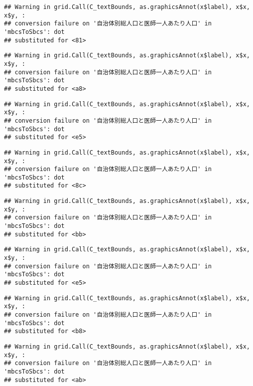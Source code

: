 \documentclass[
]{article}
\begin{document}
\begin{verbatim}
## Warning in grid.Call(C_textBounds, as.graphicsAnnot(x$label), x$x, x$y, :
## conversion failure on '自治体別総人口と医師一人あたり人口' in 'mbcsToSbcs': dot
## substituted for <81>
\end{verbatim}

\begin{verbatim}
## Warning in grid.Call(C_textBounds, as.graphicsAnnot(x$label), x$x, x$y, :
## conversion failure on '自治体別総人口と医師一人あたり人口' in 'mbcsToSbcs': dot
## substituted for <a8>
\end{verbatim}

\begin{verbatim}
## Warning in grid.Call(C_textBounds, as.graphicsAnnot(x$label), x$x, x$y, :
## conversion failure on '自治体別総人口と医師一人あたり人口' in 'mbcsToSbcs': dot
## substituted for <e5>
\end{verbatim}

\begin{verbatim}
## Warning in grid.Call(C_textBounds, as.graphicsAnnot(x$label), x$x, x$y, :
## conversion failure on '自治体別総人口と医師一人あたり人口' in 'mbcsToSbcs': dot
## substituted for <8c>
\end{verbatim}

\begin{verbatim}
## Warning in grid.Call(C_textBounds, as.graphicsAnnot(x$label), x$x, x$y, :
## conversion failure on '自治体別総人口と医師一人あたり人口' in 'mbcsToSbcs': dot
## substituted for <bb>
\end{verbatim}

\begin{verbatim}
## Warning in grid.Call(C_textBounds, as.graphicsAnnot(x$label), x$x, x$y, :
## conversion failure on '自治体別総人口と医師一人あたり人口' in 'mbcsToSbcs': dot
## substituted for <e5>
\end{verbatim}

\begin{verbatim}
## Warning in grid.Call(C_textBounds, as.graphicsAnnot(x$label), x$x, x$y, :
## conversion failure on '自治体別総人口と医師一人あたり人口' in 'mbcsToSbcs': dot
## substituted for <b8>
\end{verbatim}

\begin{verbatim}
## Warning in grid.Call(C_textBounds, as.graphicsAnnot(x$label), x$x, x$y, :
## conversion failure on '自治体別総人口と医師一人あたり人口' in 'mbcsToSbcs': dot
## substituted for <ab>
\end{verbatim}
\end{document}
